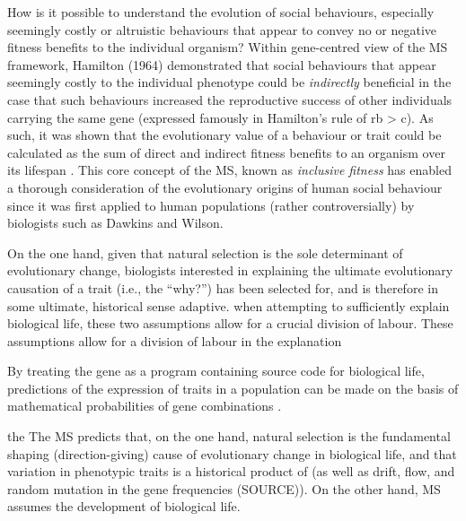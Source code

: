   How is it possible to understand the evolution of social behaviours, especially seemingly costly or altruistic behaviours that appear to convey no or negative fitness benefits to the individual organism? Within gene-centred view of the MS framework, Hamilton (1964) demonstrated that social behaviours that appear seemingly costly to the individual phenotype could be \textit{indirectly} beneficial in the case that such behaviours increased the reproductive success of other individuals carrying the same gene (expressed famously in Hamilton’s rule of rb > c).  As such, it was shown that the evolutionary value of a behaviour or trait could be calculated as the sum of direct and indirect fitness benefits to an organism over its lifespan \citep{Grafen2006}.  This core concept of the MS, known as \textit{inclusive fitness} has enabled a thorough consideration of the evolutionary origins of human social behaviour since it was first applied to human populations (rather controversially) by biologists such as Dawkins and Wilson.
























On the one hand, given that natural selection is the sole determinant of evolutionary change, biologists interested in explaining the ultimate evolutionary causation of a trait (i.e., the ``why?'')
 has been selected for, and is therefore in some ultimate, historical sense adaptive.
when attempting to sufficiently explain biological life, these two assumptions allow for a crucial division of labour.
These assumptions allow for a division of labour in the explanation

By treating the gene as a program containing source code for biological life, predictions of the expression of traits in a population can be made on the basis of mathematical probabilities of gene combinations \citep{Dawkins1972;Dawkins1982}.

the  The MS predicts that, on the one hand, natural selection is the fundamental shaping (direction-giving) cause of evolutionary change in biological life, and that variation in phenotypic traits is a historical product of (as well as drift, flow, and random mutation in the gene frequencies (SOURCE)).  On the other hand, MS assumes the development of biological life.

